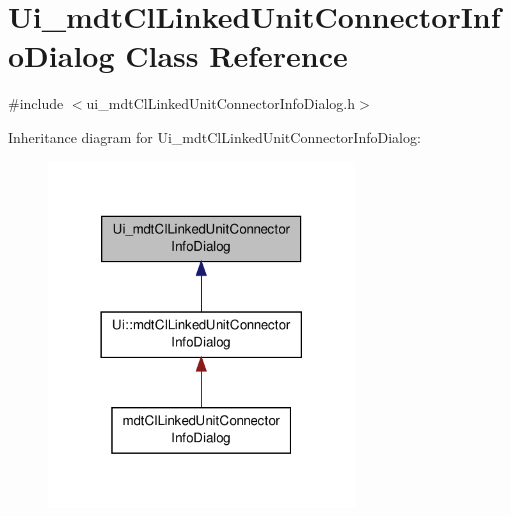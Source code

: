 \hypertarget{class_ui__mdt_cl_linked_unit_connector_info_dialog}{\section{Ui\-\_\-mdt\-Cl\-Linked\-Unit\-Connector\-Info\-Dialog Class Reference}
\label{class_ui__mdt_cl_linked_unit_connector_info_dialog}
}


{\ttfamily \#include $<$ui\-\_\-mdt\-Cl\-Linked\-Unit\-Connector\-Info\-Dialog.\-h$>$}



Inheritance diagram for Ui\-\_\-mdt\-Cl\-Linked\-Unit\-Connector\-Info\-Dialog\-:
\nopagebreak
\begin{figure}[H]
\begin{center}
\leavevmode
\includegraphics[width=230pt]{class_ui__mdt_cl_linked_unit_connector_info_dialog__inherit__graph}
\end{center}
\end{figure}


